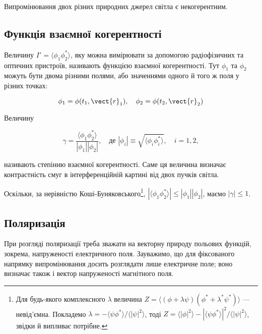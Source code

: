 Випромінювання двох різних природних джерел світла є некогерентним.

\subsection*{Функція взаємної когерентності}

Величину \(I' = \langle \phi_1 \phi_2^{*} \rangle\), яку можна вимірювати за допомогою радіофізичних та оптичних пристроїв, називають функцією взаємної
когерентності. Тут \(\phi_1\) та \(\phi_2\) можуть бути двома різними полями, або значеннями одного й того ж поля у різних точках:

\begin{equation*}
\phi_1 = \phi(t_1, \vect{r}_1), \quad \phi_2 = \phi(t_2, \vect{r}_2)
\end{equation*}

Величину

\begin{equation*}
\gamma = \frac{\langle \phi_1 \phi_2^{*} \rangle}{|\phi_1||\phi_2|}, \quad \text{де } |\phi_i| \equiv \sqrt{\langle \phi_i \phi_i^{*} \rangle}, \quad i
= 1, 2,
\end{equation*}

називають степінню взаємної когерентності. Саме ця величина визначає контрастність смуг в інтерференційній картині від двох пучків світла.

Оскільки, за нерівністю Коші-Буняковського\footnote{Для будь-якого комплексного \(\lambda\) величина \(Z = \langle (\phi + \lambda \psi)(\phi^{*} +
\lambda^{*} \psi^{*}) \rangle\) --- невід’ємна. Покладемо \(\lambda = -\langle \psi \phi^{*} \rangle / \langle |\psi|^2 \rangle\), тоді \(Z = \langle
|\phi|^2 \rangle - |\langle \psi \phi^{*} \rangle|^2 / \langle |\psi|^2 \rangle\), звідки й випливає потрібне.}, \(|\langle \phi_1 \phi_2^{*} \rangle|
\leq |\phi_1||\phi_2|\), маємо \(|\gamma| \leq 1\).

\subsection*{Поляризація}

При розгляді поляризації треба зважати на векторну природу польових функцій, зокрема, напруженості електричного поля. Зауважимо, що для фіксованого
напрямку випромінювання досить розглядати лише електричне поле; воно визначає також і вектор напруженості магнітного поля.

